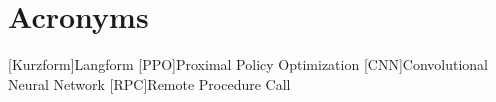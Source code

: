 \chapter*{Acronyms}

\begin{acronym}
    [Kurzform]{Langform}
    [PPO]{Proximal Policy Optimization}
    [CNN]{Convolutional Neural Network}
    [RPC]{Remote Procedure Call}

\end{acronym}

